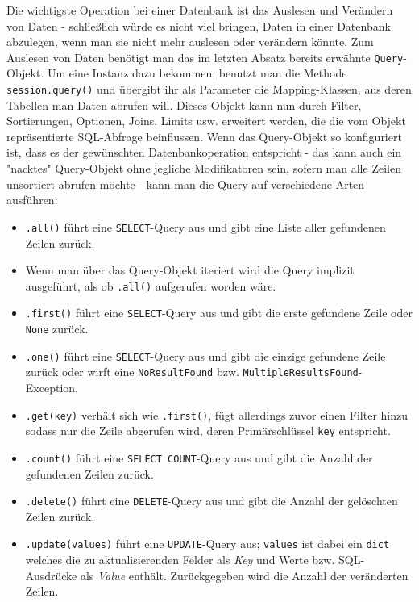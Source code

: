 Die wichtigste Operation bei einer Datenbank ist das Auslesen und Verändern von
Daten - schließlich würde es nicht viel bringen, Daten in einer Datenbank
abzulegen, wenn man sie nicht mehr auslesen oder verändern könnte. Zum Auslesen
von Daten benötigt man das im letzten Absatz bereits erwähnte
\texttt{Query}-Objekt. Um eine Instanz dazu bekommen, benutzt man die Methode
\texttt{session.query()} und übergibt ihr als Parameter die Mapping-Klassen, aus
deren Tabellen man Daten abrufen will. Dieses Objekt kann nun durch Filter,
Sortierungen, Optionen, Joins, Limits usw. erweitert werden, die die vom Objekt
repräsentierte SQL-Abfrage beinflussen. Wenn das Query-Objekt so konfiguriert
ist, dass es der gewünschten Datenbankoperation entspricht - das kann auch ein
"nacktes" Query-Objekt ohne jegliche Modifikatoren sein, sofern man alle Zeilen
unsortiert abrufen möchte - kann man die Query auf verschiedene Arten ausführen:
\begin{itemize}
\item \texttt{.all()} führt eine \texttt{SELECT}-Query aus und gibt eine Liste
aller gefundenen Zeilen zurück.

\item Wenn man über das Query-Objekt iteriert wird die Query implizit
ausgeführt, als ob \texttt{.all()} aufgerufen worden wäre.

\item \texttt{.first()} führt eine \texttt{SELECT}-Query aus und gibt die erste
gefundene Zeile oder \texttt{None} zurück.

\item \texttt{.one()} führt eine \texttt{SELECT}-Query aus und gibt die einzige
gefundene Zeile zurück oder wirft eine \texttt{NoResultFound} bzw.
\texttt{MultipleResultsFound}-Exception.

\item \texttt{.get(key)} verhält sich wie \texttt{.first()}, fügt allerdings
zuvor einen Filter hinzu sodass nur die Zeile abgerufen wird, deren
Primärschlüssel \texttt{key} entspricht.

\item \texttt{.count()} führt eine \texttt{SELECT COUNT}-Query aus und gibt die
Anzahl der gefundenen Zeilen zurück.

\item \texttt{.delete()} führt eine \texttt{DELETE}-Query aus und gibt die
Anzahl der gelöschten Zeilen zurück.

\item \texttt{.update(values)} führt eine \texttt{UPDATE}-Query aus;
\texttt{values} ist dabei ein \texttt{dict} welches die zu aktualisierenden
Felder als \emph{Key} und Werte bzw. SQL-Ausdrücke als \emph{Value} enthält.
Zurückgegeben wird die Anzahl der veränderten Zeilen.
\end{itemize}

